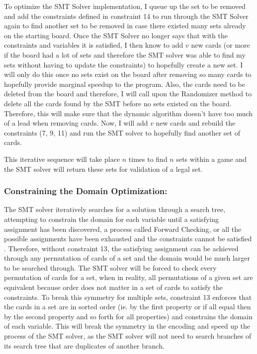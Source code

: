 \documentclass[pageno]{jpaper}
\begin{document}
To optimize the SMT Solver implementation, I queue up the set to be removed and add the constraints defined in constraint 14 to run through the SMT Solver again to find another set to be removed in case there existed many sets already on the starting board. Once the SMT Solver no longer says that with the constraints and variables it is satisfied, I then know to add $v$ new cards (or more if the board had a lot of sets and therefore the SMT solver was able to find my sets without having to update the constraints) to hopefully create a new set. I will only do this once no sets exist on the board after removing so many cards to hopefully provide marginal speedup to the program. Also, the cards need to be deleted from the board and therefore, I will call upon the Randomizer method to delete all the cards found by the SMT before no sets existed on the board. Therefore, this will make sure that the dynamic algorithm doesn't have too much of a lead when removing cards. Now, I will add $v$ new cards and rebuild the constraints (7, 9, 11) and run the SMT solver to hopefully find another set of cards. 

This iterative sequence will take place $n$ times to find $n$ sets within a game and the SMT solver will return these sets for validation of a legal set. 

\subsubsection{Constraining the Domain Optimization:}

The SMT solver iteratively searches for a solution through a search tree, attempting to constrain the domain for each variable until a satisfying assignment has been discovered, a process called Forward Checking, or all the possible assignments have been exhausted and the constraints cannot be satisfied  \cite{search_from_AI}. Therefore, without constraint 13, the satisfying assignment can be achieved through any permutation of cards of a set and the domain would be much larger to be searched through. The SMT solver will be forced to check every permutation of cards for a set, when in reality, all permutations of a given set are equivalent because order does not matter in a set of cards to satisfy the constraints. To break this symmetry for multiple sets, constraint 13 enforces that the cards in a set are in sorted order (ie. by the first property or if all equal then by the second property and so forth for all properties) and constrains the domain of each variable. This will break the symmetry in the encoding and speed up the process of the SMT solver, as the SMT solver will not need to search branches of its search tree that are duplicates of another branch. 
\end{document}
